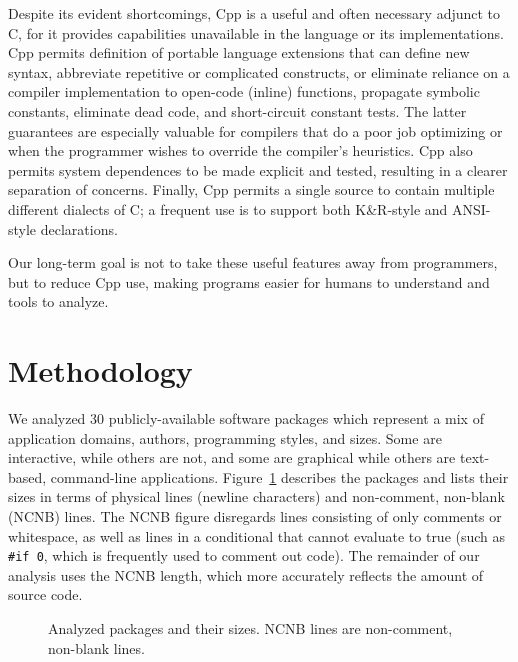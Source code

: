 \documentclass[10pt]{article}
\def\numpackages{30}
\begin{document}
Despite its evident shortcomings, Cpp is a useful and often necessary
adjunct to C, for it provides capabilities unavailable in the language or
its implementations.  Cpp permits definition of portable language
extensions that can define new syntax, abbreviate repetitive or complicated
constructs, or eliminate reliance on a compiler implementation to
open-code (inline) functions, propagate symbolic constants, eliminate dead
code, and short-circuit constant tests.  The latter guarantees are
especially valuable for compilers that do a poor job optimizing or when the
programmer wishes to override the compiler's heuristics.  Cpp also permits
system dependences to be made explicit and tested, resulting in a clearer
separation of concerns.  Finally, Cpp permits a single source to contain
multiple different dialects of C; a frequent use is to support both
K\&R-style and ANSI-style declarations.


Our long-term goal is not to take these useful features away from
programmers, but to reduce Cpp use, making programs easier for humans to
understand and tools to analyze.






\section{Methodology}
\label{sec:methodology}

We analyzed {\numpackages} publicly-available software packages which
represent a mix of application domains, authors, programming styles, and
sizes.  Some are interactive, while others are not, and some are graphical
while others are text-based, command-line applications.
Figure~\ref{fig:packages} describes the packages and lists their sizes in
terms of physical lines (newline characters) and non-comment, non-blank
(NCNB) lines.  The NCNB figure disregards lines consisting of only comments
or whitespace, as well as lines in a conditional that cannot evaluate to
true (such as {\tt \#if 0}, which is frequently used to comment out code).  The
remainder of our analysis uses the NCNB length, which more accurately
reflects the amount of source code.

\begin{figure}
\centering
{%
  \small
  \setlength{\tabcolsep}{.25em}
  
}
\caption{Analyzed packages and their sizes.  NCNB lines are non-comment,
  non-blank lines.}
\label{fig:packages}
\end{figure}
\end{document}
